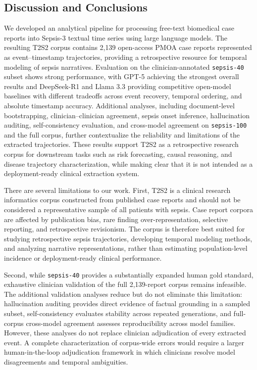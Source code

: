 \subsection{Discussion and Conclusions}
We developed an analytical pipeline for processing free-text biomedical case reports into Sepsis-3 textual time series using large language models.
The resulting T2S2 corpus contains 2,139 open-access PMOA case reports represented as event--timestamp trajectories, providing a retrospective resource for temporal modeling of sepsis narratives.
Evaluation on the clinician-annotated \texttt{sepsis-40} subset shows strong performance, with GPT-5 achieving the strongest overall results and DeepSeek-R1 and Llama 3.3 providing competitive open-model baselines with different tradeoffs across event recovery, temporal ordering, and absolute timestamp accuracy. 
Additional analyses, including document-level bootstrapping, clinician--clinician agreement, sepsis onset inference, hallucination auditing, self-consistency evaluation, and cross-model agreement on \texttt{sepsis-100} and the full corpus, further contextualize the reliability and limitations of the extracted trajectories.
These results support T2S2 as a retrospective research corpus for downstream tasks such as risk forecasting, causal reasoning, and disease trajectory characterization, while making clear that it is not intended as a deployment-ready clinical extraction system.


There are several limitations to our work.
First, T2S2 is a clinical research informatics corpus constructed from published case reports and should not be considered a representative sample of all patients with sepsis.
Case report corpora are affected by publication bias, rare finding over-representation, selective reporting, and retrospective revisionism.
The corpus is therefore best suited for studying retrospective sepsis trajectories, developing temporal modeling methods, and analyzing narrative representations, rather than estimating population-level incidence or deployment-ready clinical performance.

Second, while \texttt{sepsis-40} provides a substantially expanded human gold standard, exhaustive clinician validation of the full 2,139-report corpus remains infeasible.
The additional validation analyses reduce but do not eliminate this limitation: hallucination auditing provides direct evidence of factual grounding in a sampled subset, self-consistency evaluates stability across repeated generations, and full-corpus cross-model agreement assesses reproducibility across model families.
However, these analyses do not replace clinician adjudication of every extracted event.
A complete characterization of corpus-wide errors would require a larger human-in-the-loop adjudication framework in which clinicians resolve model disagreements and temporal ambiguities.

